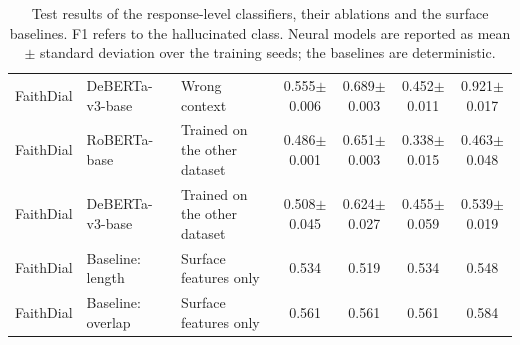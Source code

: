 \begin{table}[h]
{\begin{tabular}{lllcccc}
FaithDial & DeBERTa-v3-base & Wrong context & 0.555$\pm$0.006 & 0.689$\pm$0.003 & 0.452$\pm$0.011 & 0.921$\pm$0.017 \\
FaithDial & RoBERTa-base & Trained on the other dataset & 0.486$\pm$0.001 & 0.651$\pm$0.003 & 0.338$\pm$0.015 & 0.463$\pm$0.048 \\
FaithDial & DeBERTa-v3-base & Trained on the other dataset & 0.508$\pm$0.045 & 0.624$\pm$0.027 & 0.455$\pm$0.059 & 0.539$\pm$0.019 \\
FaithDial & Baseline: length & Surface features only & 0.534 & 0.519 & 0.534 & 0.548 \\
FaithDial & Baseline: overlap & Surface features only & 0.561 & 0.561 & 0.561 & 0.584 \\
\hline
\end{tabular}}
\caption{Test results of the response-level classifiers, their ablations and the surface baselines. F1 refers to the hallucinated class. Neural models are reported as mean $\pm$ standard deviation over the training seeds; the baselines are deterministic.}
\label{tab:p1-results}
\end{table}
